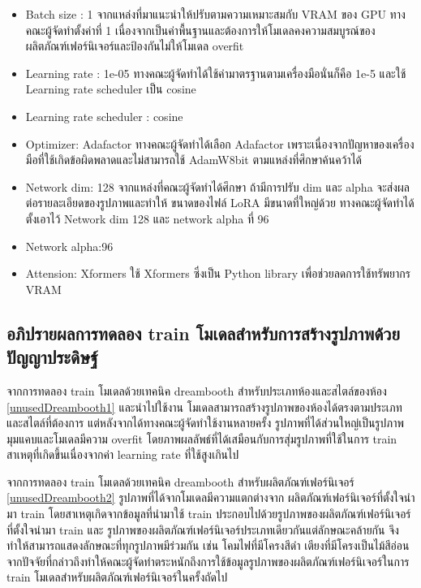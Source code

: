 \documentclass[12pt,oneside,openright,a4paper]{cpe-thai-project}
\begin{document}
\begin{enumerate}
\begin{itemize}
          \item Batch size : 1 จากแหล่งที่มาแนะนำให้ปรับตามความเหมาะสมกับ VRAM ของ GPU \cite{LoRAParameter}  ทางคณะผู้จัดทำตั้งค่าที่ 1 เนื่องจากเป็นค่าพื้นฐานและต้องการให้โมเดลคงความสมบูรณ์ของผลิตภัณฑ์เฟอร์นิเจอร์และป้องกันไม่ให้โมเดล overfit
          \item Learning rate : 1e-05 ทางคณะผู้จัดทำได้ใช้ค่ามาตรฐานตามเครื่องมือนั่นก็คือ 1e-5 และใช้ Learning rate scheduler เป็น cosine
          \item Learning rate scheduler : cosine
          \item Optimizer: Adafactor ทางคณะผู้จัดทำได้เลือก Adafactor เพราะเนื่องจากปัญหาของเครื่องมือที่ใช้เกิดข้อผิดพลาดและไม่สามารถใช้ AdamW8bit ตามแหล่งที่ศึกษาค้นคว้าได้ \cite{LoRAParameter}
          \item Network dim: 128 จากแหล่งที่คณะผู้จัดทำได้ศึกษา \cite{LoRAAttension}  ถ้ามีการปรับ dim และ alpha จะส่งผลต่อรายละเอียดของรูปภาพและทำให้ ขนาดของไฟล์ LoRA มีขนาดที่ใหญ่ด้วย ทางคณะผู้จัดทำได้ตั้งเอาไว้ Network dim 128 และ network alpha ที่ 96
          \item Network alpha:96
          \item Attension: Xformers  ใช้ Xformers ซึ่งเป็น Python library เพื่อช่วยลดการใช้ทรัพยากร VRAM \cite{LoRAParameter}
        \end{itemize}
\end{enumerate}
\subsection{อภิปรายผลการทดลอง train โมเดลสำหรับการสร้างรูปภาพด้วยปัญญาประดิษฐ์}
\hspace{18pt}จากการทดลอง train โมเดลด้วยเทคนิค dreambooth สำหรับประเภทห้องและสไตล์ของห้อง \ref{unusedDreambooth1} และนำไปใช้งาน โมเดลสามารถสร้างรูปภาพของห้องได้ตรงตามประเภทและสไตล์ที่ต้องการ แต่หลังจากได้ทางคณะผู้จัดทำใช้งานหลายครั้ง รูปภาพที่ได้ส่วนใหญ่เป็นรูปภาพมุมแคบและโมเดลมีความ overfit โดยภาพผลลัพธ์ที่ได้เสมือนกับการสุ่มรูปภาพที่ใช้ในการ train สาเหตุที่เกิดขึ้นเนื่องจากค่า learning rate ที่ใช้สูงเกินไป

\hspace{18pt}จากการทดลอง train โมเดลด้วยเทคนิค dreambooth สำหรับผลิตภัณฑ์เฟอร์นิเจอร์ \ref{unusedDreambooth2} รูปภาพที่ได้จากโมเดลมีความแตกต่างจาก ผลิตภัณฑ์เฟอร์นิเจอร์ที่ตั้งใจนำมา train โดยสาเหตุเกิดจากข้อมูลที่นำมาใช้ train ประกอบไปด้วยรูปภาพของผลิตภัณฑ์เฟอร์นิเจอร์ที่ตั้งใจนำมา train และ รูปภาพของผลิตภัณฑ์เฟอร์นิเจอร์ประเภทเดียวกันแต่ลักษณะคล้ายกัน จึงทำให้สามารถแสดงลักษณะที่ทุกรูปภาพมีร่วมกัน เช่น โคมไฟที่มีโครงสีดำ เตียงที่มีโครงเป็นไม้สีอ่อน จากปัจจัยที่กล่าวถึงทำให้คณะผู้จัดทำตระหนักถึงการใช้ข้อมูลรูปภาพของผลิตภัณฑ์เฟอร์นิเจอร์ในการ train โมเดลสำหรับผลิตภัณฑ์เฟอร์นิเจอร์ในครั้งถัดไป
\end{document}
